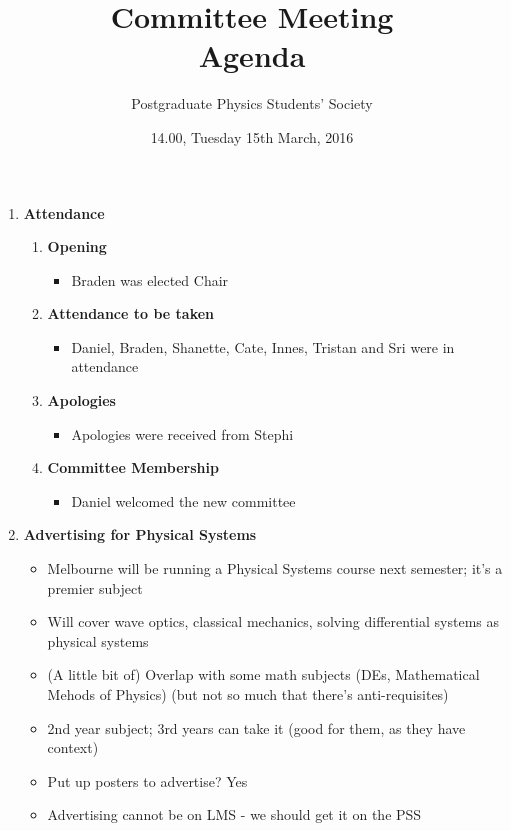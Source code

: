 \documentclass[a4paper,12pt]{article}
\title{Committee Meeting\\Agenda}
\author{Postgraduate Physics Students' Society}
\date{14.00, Tuesday 15th March, 2016}
\newcommand{\itemi}[1]{\bf\large #1}
\newcommand{\itemii}[1]{\bf #1}
\begin{document}
\thispagestyle{empty}\pagestyle{empty}
\maketitle
\begin{enumerate}
\item {\itemi Attendance}
	\begin{enumerate}
	\item {\itemii Opening}
	\begin{itemize}
	\item Braden was elected Chair
	\end{itemize}
	\item {\itemii Attendance to be taken}
	\begin{itemize}
	\item Daniel, Braden, Shanette, Cate, Innes, Tristan and Sri were in attendance
	\end{itemize}
	\item {\itemii Apologies}
	\begin{itemize}
	\item Apologies were received from Stephi
	\end{itemize}
	\item {\itemii Committee Membership}
	\begin{itemize}
	\item Daniel welcomed the new committee
	\end{itemize}
	\end{enumerate}
\item {\itemi Advertising for Physical Systems}
\begin{itemize}
\item Melbourne will be running a Physical Systems course next semester; it's a premier subject

\item Will cover wave optics, classical mechanics, solving differential systems as physical systems

\item (A little bit of) Overlap with some math subjects (DEs, Mathematical Mehods of Physics) (but not so much that there's anti-requisites)

\item 2nd year subject; 3rd years can take it (good for them, as they have context)

\item Put up posters to advertise? Yes

\item Advertising cannot be on LMS - we should get it on the PSS


\end{itemize}
\end{enumerate}
\end{document}
